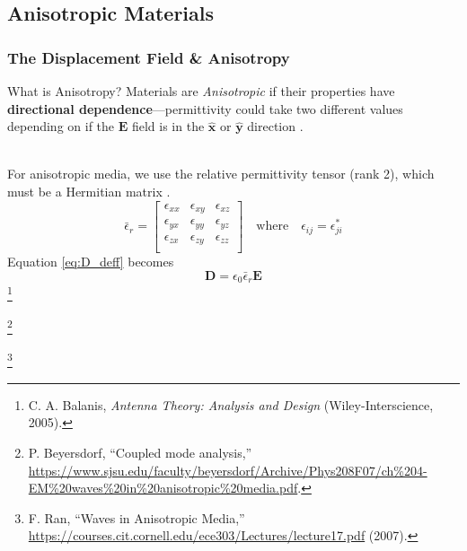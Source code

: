 \documentclass[aspectratio=169,t,xcolor=table]{beamer}
\newcommand{\bv}[1]{\mathbf{#1}}
\newcommand{\vecc}[1]{\mathbf{#1}}
\newcommand\blfootnote[1]{%
  \begingroup
  \renewcommand\thefootnote{}\footnote[frame]{\tiny #1}%
  \addtocounter{footnote}{-1}%
  \endgroup
}
\begin{document}
\subsection{Anisotropic Materials}
\begin{frame}
    \frametitle{The Displacement Field \& Anisotropy}\vspace{-1em}
    \begin{alertblock}{What is Anisotropy?}
        Materials are \textit{Anisotropic} if their properties have 
        \textbf{directional
        dependence}---permittivity could take
        two different values depending on if the $\bv{E}$ field is in the 
        $\bv{\hat{x}}$ or $\bv{\hat{y}}$ direction \cite{Balanis-2012}.
    \end{alertblock}\\
    \vspace{0.2em}\pause
    For anisotropic media, we use the relative permittivity tensor (rank 2), 
    which must be a Hermitian matrix \cite{CWA_S, Wav_anis}.
    \begin{equation}\label{eq:eps_ten}
        \bar{\epsilon}_r = \begin{bmatrix}
            \epsilon_{xx} & \epsilon_{xy} & \epsilon_{xz}\\
            \epsilon_{yx} & \epsilon_{yy} & \epsilon_{yz}\\
            \epsilon_{zx} & \epsilon_{zy} & \epsilon_{zz}\\
        \end{bmatrix}
        \quad\text{where}\quad
        \epsilon_{ij} = \epsilon_{ji}^*
    \end{equation}
    Equation \eqref{eq:D_deff} becomes
    \begin{equation}\label{eq:D_anis}
        \vecc{D} =  \epsilon_0\bar{\epsilon}_r \vecc{E}
    \end{equation}
    \blfootnote{
        \cite{Balanis-2012} C. A. Balanis, \textit{Antenna Theory: 
        Analysis and Design}
        (Wiley-Interscience, 2005).
    }
    \blfootnote{
        \cite{CWA_S} P. Beyersdorf, ``Coupled mode analysis,''
        \url{https://www.sjsu.edu/faculty/beyersdorf/Archive/Phys208F07/ch\%204-EM\%20waves\%20in\%20anisotropic\%20media.pdf}.
    }
    \blfootnote{
        \cite{Wav_anis} F. Ran, ``Waves in Anisotropic Media,''
        \url{https://courses.cit.cornell.edu/ece303/Lectures/lecture17.pdf} (2007).
    }
\end{frame}
\end{document}
